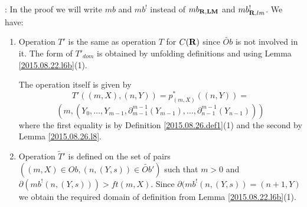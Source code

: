 \documentclass[11pt]{article}
\newenvironment{proof}{{\bf Proof}:}{\vskip 5mm }
\newcommand{\rr}{{\bf R}}
\newcommand{\lm}{{\bf LM}}
\newcommand{\wt}{\widetilde}
\begin{document}
%
\begin{proof}
In the proof we will write $mb$ and $mb^!$ instead of $mb_{\rr,\lm}$ and $mb^!_{\rr,lm}$. We have:
%
\begin{enumerate}
%
\item Operation $T'$ is the same as operation $T$ for $C(\rr)$ since $\wt{Ob}$ is not involved in it. The form of $T'_{dom}$ is obtained by unfolding definitions and 
using Lemma \ref{2015.08.22.l6b}(1). 

The operation itself is given by 
%
$$T'((m,X),(n,Y))=p_{(m,X)}^*((n,Y))=$$
$$(m,(Y_0,\dots,Y_{m-1},\partial_{m-1}^{m-1}(Y_{m-1}),\dots, \partial_{n-1}^{m-1}(Y_{n-1})))$$
%
where the first equality is by Definition \ref{2015.08.26.def1}(1) and the second by Lemma \ref{2015.08.26.l8}. 
%
\item Operation $\wt{T}'$ is defined on the set of pairs $((m,X)\in Ob, (n,(Y,s))\in \wt{Ob}')$ such that $m>0$ and $\partial(mb^!(n,(Y,s)))>ft(m,X)$. Since $\partial(mb^!(n,(Y,s))=(n+1,Y)$ we obtain the required domain of definition from Lemma \ref{2015.08.22.l6b}(1). 


\end{enumerate}
\end{proof}
\end{document}
